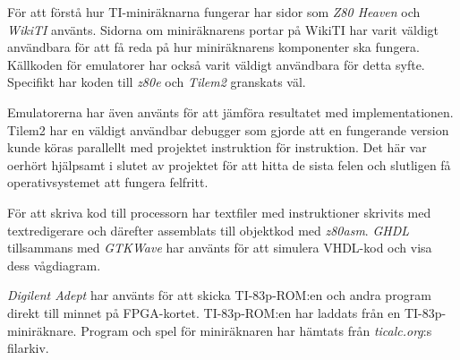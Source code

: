 \documentclass[main.tex]{subfiles}
\begin{document}
För att förstå hur TI-miniräknarna fungerar har sidor som {\it Z80
Heaven}\cite{z80heaven} och {\it WikiTI}\cite{wikiti} använts. Sidorna om
miniräknarens portar på WikiTI har varit väldigt användbara för att få reda på
hur miniräknarens komponenter ska fungera. Källkoden för emulatorer har också
varit väldigt användbara för detta syfte. Specifikt har koden till {\it
z80e}\cite{z80e} och {\it Tilem2}\cite{tilem2} granskats väl.

Emulatorerna har även använts för att jämföra resultatet med implementationen.
Tilem2 har en väldigt användbar debugger som gjorde att en fungerande version
kunde köras parallellt med projektet instruktion för instruktion. Det här var
oerhört hjälpsamt i slutet av projektet för att hitta de sista felen och
slutligen få operativsystemet att fungera felfritt.

För att skriva kod till processorn har textfiler med instruktioner skrivits med
textredigerare och därefter assemblats till objektkod med {\it
z80asm}\cite{z80asm}. {\it GHDL}\cite{ghdl} tillsammans med {\it
GTKWave}\cite{gtkwave} har använts för att simulera VHDL-kod och visa dess
vågdiagram.

{\it Digilent Adept} har använts för att skicka TI-83p-ROM:en och andra program
direkt till minnet på FPGA-kortet. TI-83p-ROM:en har laddats från en
TI-83p-miniräknare. Program och spel för miniräknaren har hämtats från {\it
ticalc.org}:s filarkiv\cite{ticalc}.
\end{document}
